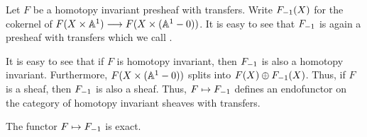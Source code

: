\begin{defn}\label{def_contract}
Let $F$ be a homotopy invariant presheaf with transfers. Write
$F_{-1}(X)$ for the cokernel of $F(X \times \mathbb{A}^1) \longrightarrow F(X \times 
(\mathbb{A}^1 - 0))$. It is easy to see that $F_{-1}$ is again a presheaf
with transfers which we call .
\end{defn}

It is easy to see that if $F$ is homotopy invariant, then $F_{-1}$ 
is also a homotopy invariant. Furthermore, $F(X \times (\mathbb{A}^1 - 0))$
splits into $F(X) \oplus F_{-1}(X)$. Thus, if $F$ is a sheaf, then
$F_{-1}$ is also a sheaf. Thus, $F \mapsto F_{-1}$ defines an
endofunctor on the category of homotopy invariant sheaves with 
transfers.

\begin{prop}
\label{prop_contract_is_exact}
The functor $F \mapsto F_{-1}$ is exact.
\end{prop}
